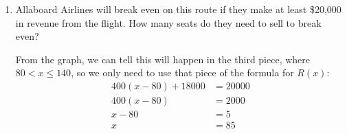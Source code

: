 \documentclass{article}
\providecommand{\check}{}
\renewcommand{\check}{\ifmmode{\text{ \ding{51} }}\else{\ding{51} }\fi}
\newenvironment{checkanswer}{\color{checkcolor}\check}{\color{black}}
\theoremstyle{theorem}
\begin{document}
\begin{enumerate}
\begin{enumerate}
    \begin{solution}
      If $x \leq 40$, then $R(x) = 150 x$. If $40 < x \leq 80$, then
      \[ R(x) = \underbrace{150 \cdot 40}_{\text{revenue from first 40 seats}} + \underbrace{300 (x - 40)}_\text{revenue from rest of seats}\] And if $x > 80$, then
      \[ R(x) = \underbrace{150 \cdot 40}_{\text{revenue from first 40 seats}} + \underbrace{300 \cdot 40}_{\text{revenue from next 40 seats}} + \underbrace{400 (x - 80)}_\text{revenue from rest of seats}\]
      So,
      \[ R(x) =
        \boxed{
          \begin{cases}
            150 x & \text{ if } 0 \leq x \leq 40 \\
            300(x-40)+6000 & \text{ if } 40 < x \leq 80 \\
            400(x-80)+18000 & \text{ if } 80 < x \leq 140
          \end{cases}}
      \]
      \begin{checkanswer}
        A good check is to make sure this formula agrees with the important points we labeled on our graph. According to this formula,
        \begin{itemize}[nosep]
        \item $R(40) = 6000$ \check
        \item $R(80) = 300 \cdot 40 + 6000 = 18000$ \check
        \item $R(140) = 400 \cdot 60 + 18000 = 42000$ \check
        \end{itemize}
      \end{checkanswer}
    \end{solution}

  \item
    \begin{problem}[\vfill]
      Allaboard Airlines will break even on this route if they make at least \$20,000 in revenue from the flight. How many seats do they need to sell to break even?
    \end{problem}

    \begin{solution}
      From the graph, we can tell this will happen in the third piece, where $80 < x \leq 140$, so we only need to use that piece of the formula for $R(x)$:
      \begin{align*}
         400(x-80)+18000 &= 20000 \\
         400(x-80)  &= 2000   \\
         x-80  &= 5  \\
         x &= \boxed{85}
       \end{align*}
    \end{solution} 


\end{enumerate}
\end{enumerate}
\end{document}

